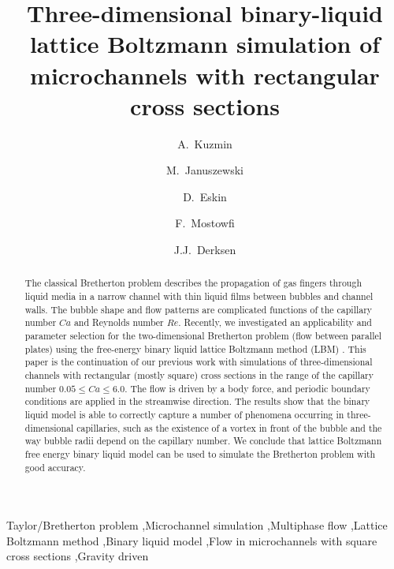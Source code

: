 \documentclass[preprint,12pt]{elsarticle}
\begin{document}
\begin{frontmatter}
\title{Three-dimensional binary-liquid lattice Boltzmann simulation of microchannels with rectangular
cross sections}
\author[uofa]{A.~Kuzmin}
\author[us]{M.~Januszewski}
\author[schlum]{D.~Eskin}
\author[schlum]{F.~Mostowfi}
\author[uofa]{J.J.~Derksen}
\address[uofa]{Chemical and Materials Engineering, University of Alberta\\ 7th Floor, ECERF, 9107
116 St, Edmonton, Alberta, T6G
2V4 Canada}
\address[us]{Insitute of Physics, University of Silesia, 40-007 Katowice, Poland}
\address[schlum]{Schlumberger DBR Technology Center\\ 9450 17 Ave NW, Edmonton, Alberta, T6N 1M9
Canada}
\begin{abstract}
The classical Bretherton problem describes the propagation of gas fingers through liquid media in a
narrow channel with
thin liquid films between bubbles and channel walls. The bubble shape and flow patterns are
complicated functions of the capillary number $Ca$ and Reynolds number $Re$. Recently, we
investigated
an applicability and parameter selection for the two-dimensional Bretherton problem
(flow
between parallel plates) using the free-energy binary liquid lattice Boltzmann method (LBM)
\cite{kuzmin-binary2d}. This paper is the continuation of our previous work with simulations of
three-dimensional channels with rectangular (mostly square) cross sections in the range of the capillary number $0.05\leq
Ca \leq
6.0$.
The flow is driven by a body force, and
periodic boundary conditions are applied in the streamwise direction. The results show that the
binary liquid model is able to correctly capture a number of phenomena occurring in three-dimensional
capillaries, such as the existence of a vortex in front of the bubble and the way bubble radii
depend on the capillary number.  We conclude that lattice Boltzmann free energy binary
liquid model can be used to simulate the Bretherton problem with good accuracy. 
\end{abstract}

\begin{keyword}
Taylor/Bretherton problem \sep Microchannel simulation \sep Multiphase flow \sep Lattice Boltzmann
method
\sep Binary liquid model \sep Flow in microchannels with square cross sections \sep Gravity driven

\end{keyword}

\end{frontmatter}
\linenumbers
\end{document}
